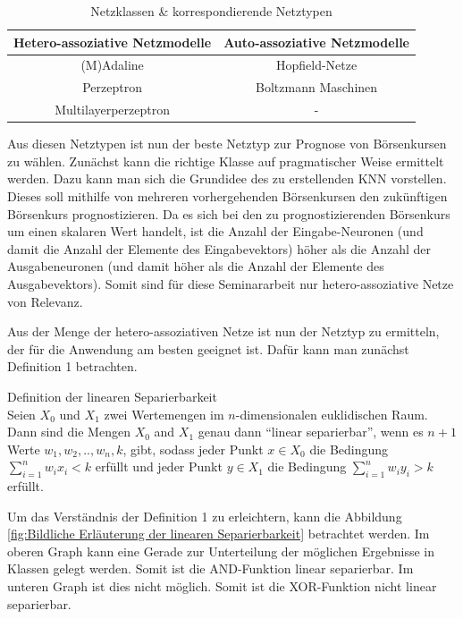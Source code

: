 \begin{table}[H]
\centering
\begin{tabular}{|c|c|}
\hline 
\textbf{Hetero-assoziative Netzmodelle} & \textbf{Auto-assoziative Netzmodelle} \\ 
\hline 
(M)Adaline & Hopfield-Netze \\ 
\hline  
Perzeptron &  Boltzmann Maschinen \\ 
\hline 
Multilayerperzeptron & - \\ 
\hline 
\end{tabular} 
\label{tab:Netztypen}
\caption{Netzklassen \& korrespondierende Netztypen}
\end{table}

Aus diesen Netztypen ist nun der beste Netztyp zur Prognose von Börsenkursen zu wählen. Zunächst kann die richtige Klasse auf pragmatischer Weise ermittelt werden. Dazu kann man sich die Grundidee des zu erstellenden KNN vorstellen. Dieses soll mithilfe von mehreren vorhergehenden Börsenkursen den zukünftigen Börsenkurs prognostizieren. Da es sich bei den zu prognostizierenden Börsenkurs um einen skalaren Wert handelt, ist die Anzahl der Eingabe-Neuronen (und damit die Anzahl der Elemente des Eingabevektors) höher als die Anzahl der Ausgabeneuronen (und damit höher als die Anzahl der Elemente des Ausgabevektors). Somit sind für diese Seminararbeit nur hetero-assoziative Netze von Relevanz.

Aus der Menge der hetero-assoziativen Netze ist nun der Netztyp zu ermitteln, der für die Anwendung am besten geeignet ist. Dafür kann man zunächst Definition 1 betrachten.

\begin{defi}Definition der linearen Separierbarkeit\\
Seien $X_{0}$ und $X_{1}$ zwei Wertemengen im $n$-dimensionalen euklidischen Raum. Dann sind die Mengen $X_{0}$ and $X_{1}$ genau dann  "`linear separierbar"', wenn es  $n+1$ Werte $w_{1}, w_{2},..,w_{n}, k$, gibt, sodass jeder Punkt  $x \in X_{0}$ die Bedingung $\sum^{n}_{i=1} w_{i}x_{i} < k$ erfüllt und jeder Punkt $y \in X_{1}$ die Bedingung $\sum^{n}_{i=1} w_{i}y_{i} > k$ erfüllt.
\end{defi}

Um das Verständnis der Definition 1 zu erleichtern, kann die Abbildung \ref{fig:Bildliche Erläuterung der linearen Separierbarkeit} betrachtet werden. Im oberen Graph kann eine Gerade zur Unterteilung der möglichen Ergebnisse in Klassen gelegt werden. Somit ist die AND-Funktion linear separierbar. Im unteren Graph ist dies nicht möglich. Somit ist die XOR-Funktion nicht linear separierbar.  

